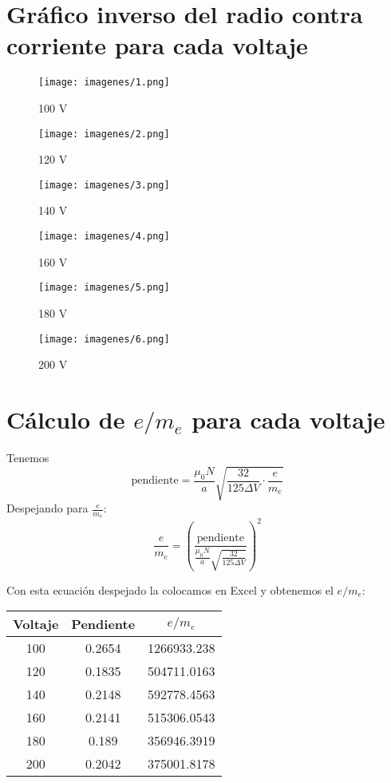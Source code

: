     \section{Gráfico inverso del radio contra corriente para cada voltaje}
    \begin{figure}[H]
        \centering
        \texttt{[image: imagenes/1.png]}
        \caption{100 V}
    \end{figure}
    \begin{figure}[H]
        \centering
        \texttt{[image: imagenes/2.png]}
        \caption{120 V}
    \end{figure}
    \begin{figure}[H]
        \centering
        \texttt{[image: imagenes/3.png]}
        \caption{140 V}
    \end{figure}
    \begin{figure}[H]
        \centering
        \texttt{[image: imagenes/4.png]}
        \caption{160 V}
    \end{figure}
    \begin{figure}[H]
        \centering
        \texttt{[image: imagenes/5.png]}
        \caption{180 V}
    \end{figure}
    \begin{figure}[H]
        \centering
        \texttt{[image: imagenes/6.png]}
        \caption{200 V}
    \end{figure}

\section{Cálculo de $e/m_e$ para cada voltaje}

    Tenemos 
    $$\text{pendiente}=\frac{\mu_0 N }{a}\sqrt{\frac{32}{125 \Delta V}\cdot \frac{e}{m_e}}$$
    Despejando para $\frac{e}{m_e}:$
    $$\frac{e}{m_e} = \left(\frac{\text{pendiente}}{\frac{\mu_0 N }{a}\sqrt{\frac{32}{125 \Delta V}}}\right)^2 $$

    Con esta ecuación despejado la colocamos en Excel y obtenemos el $e/m_e$:

\begin{table}[H]
    \centering 
    \begin{tabular}{@{}ccc@{}}
    \toprule
    Voltaje & Pendiente & $e/m_e$     \\ \midrule
    100     & 0.2654    & 1266933.238 \\
    120     & 0.1835    & 504711.0163 \\
    140     & 0.2148    & 592778.4563 \\
    160     & 0.2141    & 515306.0543 \\
    180     & 0.189     & 356946.3919 \\
    200     & 0.2042    & 375001.8178 \\ \bottomrule
    \end{tabular}
    \end{table}

